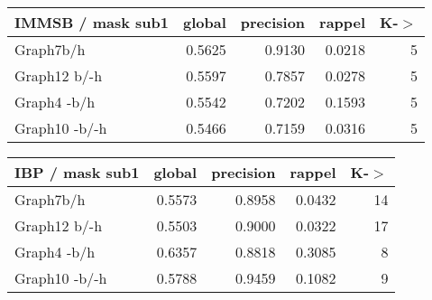 \begin{table*}[h]
\caption{K = 5}
	\begin{minipage}[h]{0.45\linewidth} 
\begin{tabular}{lrrrr}
\hline
 IMMSB / mask sub1   &   global &   precision &   rappel &    K-\ensuremath{>} \\
\hline
 Graph7b/h           &   0.5625 &      0.9130 &   0.0218 & 5 \\
 Graph12 b/-h        &   0.5597 &      0.7857 &   0.0278 & 5 \\
 Graph4 -b/h         &   0.5542 &      0.7202 &   0.1593 & 5 \\
 Graph10 -b/-h       &   0.5466 &      0.7159 &   0.0316 & 5 \\
\hline
\end{tabular}
\end{minipage}
\hspace{0.5cm}
\begin{minipage}[h]{0.45\linewidth}
\begin{tabular}{lrrrr}
\hline
 IBP / mask sub1   &   global &   precision &   rappel &     K-\ensuremath{>} \\
\hline
 Graph7b/h         &   0.5573 &      0.8958 &   0.0432 & 14 \\
 Graph12 b/-h      &   0.5503 &      0.9000 &   0.0322 & 17 \\
 Graph4 -b/h       &   0.6357 &      0.8818 &   0.3085 &  8 \\
 Graph10 -b/-h     &   0.5788 &      0.9459 &   0.1082 &  9 \\
\hline
\end{tabular}
\end{minipage}
\end{table*}


